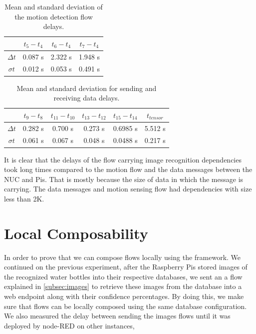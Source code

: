 \begin{table}[H]
\centering
\begin{tabular}{*{4}{c}}\toprule
&$t_5 - t_4$  & $t_6 - t_4$  & $t_7-t_4$ \\ \midrule
$\Delta t$ &0.087 s&2.322 s&1.948 s\\
$\sigma t$&0.012 s&0.053 s&0.491 s\\
\end{tabular}
\caption{Mean and standard deviation of the motion detection flow delays.}
\label{table:motion}
\end{table}

\begin{table}[H]
\centering
\begin{tabular}{*{6}{c}}	\toprule
&$t_9 - t_8$  & $t_{11} - t_{10}$  & $t_{13}-t_{12}$ & $t_{15}-t_{14}$&  $t_{tensor}$ \\ \midrule
$\Delta t$&0.282 s&0.700 s&	0.273 s&0.6985 s&5.512 s\\
$\sigma t$&0.061 s&0.067 s&	0.048 s&0.0488 s&0.217 s\\
	\end{tabular}
	\caption{Mean and standard deviation for sending and receiving data delays.}
	\label{table:data}
\end{table}

\noindent It is clear that the delays of the flow carrying image recognition dependencies took long times compared to the motion flow and the data messages between the NUC and Pis. That is mostly because the size of data in which the message is carrying. The data messages and motion sensing flow had dependencies with size less than 2K.

\section{Local Composability}
In order to prove that we can compose flows locally using the framework. We continued on the previous experiment, after the Raspberry Pis stored images of the recognized water bottles into their respective  databases, we sent an a flow explained in \ref{subsec:images} to retrieve these images from the database into a web endpoint along with their confidence percentages. By doing this, we make sure that flows can be locally composed using the same database configuration. We also measured the delay between sending the images flows until it was deployed by node-RED on other instances,

